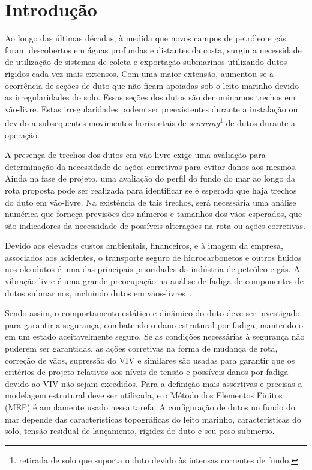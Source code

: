 \chapter{Introdução}


Ao longo das últimas décadas, à medida que novos campos de petróleo e gás foram descobertos em águas profundas e distantes da costa, surgiu a necessidade de utilização de sistemas de coleta e exportação submarinos utilizando dutos rígidos cada vez mais extensos.
Com uma maior extensão, aumentou-se a ocorrência de seções de duto que não ficam apoiadas sob o leito marinho devido as irregularidades do solo. Essas seções dos dutos são denominamos trechos em vão-livre. Estas irregularidades podem ser preexistentes durante a instalação ou devido a subsequentes movimentos horizontais de \textit{scouring}\footnote{retirada de solo que suporta o duto devido às intensas correntes de fundo.} de dutos durante a operação.

A presença de trechos dos dutos em vão-livre exige uma avaliação para determinação da necessidade de ações corretivas para evitar danos aos mesmos.
Ainda na fase de projeto, uma avaliação do perfil do fundo do mar ao longo da rota proposta pode ser realizada para identificar se é esperado que haja trechos do duto em vão-livre.
Na existência de tais trechos, será necessária uma análise numérica que forneça previsões dos números e tamanhos dos vãos esperados, que são indicadores da necessidade de possíveis alterações na rota ou ações corretivas.

Devido aos elevados custos ambientais, financeiros, e à imagem da empresa, associados aos acidentes, o transporte seguro de hidrocarbonetos e outros fluidos nos oleodutos é uma das principais prioridades da indústria de petróleo e gás.
A vibração livre é uma grande preocupação na análise de fadiga de componentes de dutos submarinos, incluindo dutos em vãos-livres~\cite{Gamino2013}.

Sendo assim, o comportamento estático e dinâmico do duto deve ser investigado para garantir a segurança, combatendo o dano estrutural por fadiga, mantendo-o em um estado aceitavelmente seguro.
Se as condições necessárias à segurança não puderem ser garantidas, as ações corretivas na forma de mudança de rota, correção de vãos, supressão do VIV e similares são usadas para garantir que os critérios de projeto relativos aos níveis de tensão e possíveis danos por fadiga devido ao VIV não sejam excedidos.
Para a definição mais assertivas e precisas a modelagem estrutural deve ser utilizada, e o Método dos Elementos Finitos (MEF) é amplamente usado nessa tarefa.
A configuração de dutos no fundo do mar depende das características topográficas do leito marinho, características do solo, tensão residual de lançamento, rigidez do duto e seu peso submerso.

